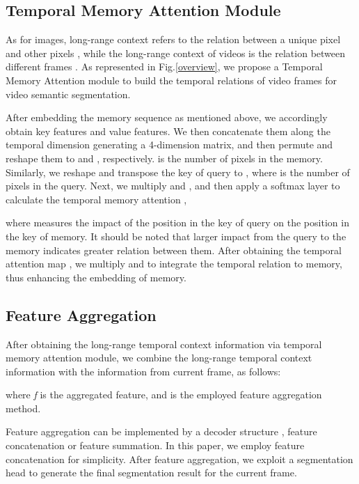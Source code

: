 \documentclass{article}
\begin{document}
	\subsection{Temporal Memory Attention Module}
	
	As for images, long-range context refers to the relation between a unique pixel and other pixels \cite{DANet2019}, while the long-range context of videos is the relation between different frames \cite{nonlocal2018, STA2019}. As represented in Fig.\ref{overview}, we propose a Temporal Memory Attention module to build the temporal relations of video frames for video semantic segmentation.
	
	After embedding the memory sequence as mentioned above, we accordingly obtain  key features and  value features. 
	We then concatenate them along the temporal dimension generating a 4-dimension matrix, and then permute and reshape them to  and , respectively.  
 is the number of pixels in the memory.
Similarly, we reshape and transpose the key of query to , where  is the number of pixels in the query.
Next, we multiply  and , and then apply a softmax layer to calculate the temporal memory attention ,
	\vspace{-0.2cm}
	
	where  measures the impact of the  position in the key of query on the  position in the key of memory.  
	It should be noted that larger impact from the query to the memory indicates greater relation between them.
	After obtaining the temporal attention map , we multiply  and  to integrate the temporal relation to memory, thus enhancing the embedding of memory.
	
	\subsection{Feature Aggregation}
	
	After obtaining the long-range temporal context information via temporal memory attention module, 
we combine the long-range temporal context information with the information from current frame, as follows:
	\vspace{-0.2cm}
	
	where \textit{f} is the aggregated feature, and \textit{} is the employed feature aggregation method.


	Feature aggregation can be implemented by a decoder structure \cite{deeplabv3+2018} , feature concatenation or feature summation. In this paper, we employ feature concatenation for simplicity. After feature aggregation, we exploit a segmentation head to generate the final segmentation result for the current frame.
	
\end{document}
